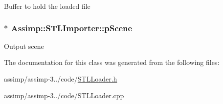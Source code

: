 Buffer to hold the loaded file \hypertarget{class_assimp_1_1_s_t_l_importer_a28bd9586dc31a20f5d56955e82e33b45}{
\subsubsection[{p\+Scene}]{$\ast$ Assimp\+::\+S\+T\+L\+Importer\+::p\+Scene\hspace{0.3cm}{\ttfamily [protected]}}}\label{class_assimp_1_1_s_t_l_importer_a28bd9586dc31a20f5d56955e82e33b45}
Output scene 

The documentation for this class was generated from the following files\+:\begin{DoxyCompactItemize}
\item 
assimp/assimp-\/3../code/\hyperlink{_s_t_l_loader_8h}{S\+T\+L\+Loader.\+h}\item 
assimp/assimp-\/3../code/S\+T\+L\+Loader.\+cpp\end{DoxyCompactItemize}
